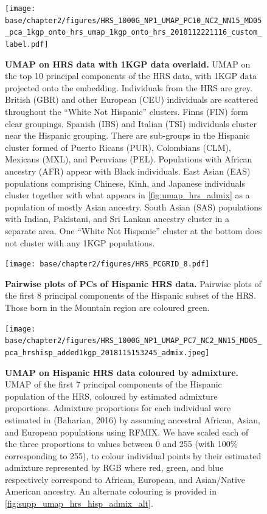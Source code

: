 \begin{figure}[ht]
    \centering
    \texttt{[image: base/chapter2/figures/HRS\_1000G\_NP1\_UMAP\_PC10\_NC2\_NN15\_MD05\_pca\_1kgp\_onto\_hrs\_umap\_1kgp\_onto\_hrs\_2018112221116\_custom\_label.pdf]}
    \caption[UMAP on HRS data with 1KGP data overlaid]{\textbf{UMAP on HRS data with 1KGP data overlaid.} UMAP on the top 10 principal components of the HRS data, with 1KGP data projected onto the embedding. Individuals from the HRS are grey. British (GBR) and other European (CEU) individuals are scattered throughout the ``White Not Hispanic'' clusters. Finns (FIN) form clear groupings. Spanish (IBS) and Italian (TSI) individuals cluster near the Hispanic grouping. There are sub-groups in the Hispanic cluster formed of Puerto Ricans (PUR), Colombians (CLM), Mexicans (MXL), and Peruvians (PEL). Populations with African ancestry (AFR) appear with Black individuals. East Asian (EAS) populations comprising Chinese, Kinh, and Japanese individuals cluster together with what appears in \ref{fig:umap_hrs_admix} as a population of mostly Asian ancestry. South Asian (SAS) populations with Indian, Pakistani, and Sri Lankan ancestry cluster in a separate area. One ``White Not Hispanic'' cluster at the bottom does not cluster with any 1KGP populations.}
    \label{fig:supp_hrs_1kgp_projected}
\end{figure}

\newpage

\begin{figure}[ht]
    \centering
    \texttt{[image: base/chapter2/figures/HRS\_PCGRID\_8.pdf]}
    \caption[Pairwise plots of PCs of Hispanic HRS data]{\textbf{Pairwise plots of PCs of Hispanic HRS data.} Pairwise plots of the first 8 principal components of the Hispanic subset of the HRS. Those born in the Mountain region are coloured green.}
    \label{fig:supp_hrs_hisp_grid}
\end{figure}

\newpage

\begin{figure}[ht]
    \centering
    \texttt{[image: base/chapter2/figures/HRS\_1000G\_NP1\_UMAP\_PC7\_NC2\_NN15\_MD05\_pca\_hrshisp\_added1kgp\_2018115153245\_admix.jpeg]}
    \caption[UMAP on Hispanic HRS data coloured by admixture]{\textbf{UMAP on Hispanic HRS data coloured by admixture.} UMAP of the first 7 principal components of the Hispanic population of the HRS, coloured by estimated admixture proportions. Admixture proportions for each individual were estimated in (Baharian, 2016) by assuming ancestral African, Asian, and European populations using RFMIX. We have scaled each of the three proportions to values between 0 and 255 (with 100\% corresponding to 255), to colour individual points by their estimated admixture represented by RGB where red, green, and blue respectively correspond to African, European, and Asian/Native American ancestry. An alternate colouring is provided in \ref{fig:supp_umap_hrs_hisp_admix_alt}.}
    \label{fig:supp_umap_hrs_hisp_admix}
\end{figure}

